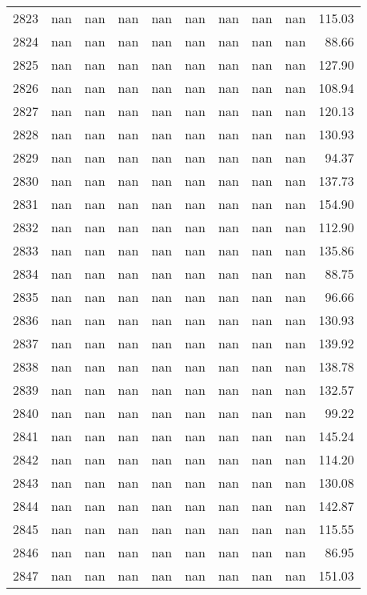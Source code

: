 \begin{tabular}{lrrrrrrrrr}
2823 & nan & nan & nan & nan & nan & nan & nan & nan & 115.03 \\
2824 & nan & nan & nan & nan & nan & nan & nan & nan & 88.66 \\
2825 & nan & nan & nan & nan & nan & nan & nan & nan & 127.90 \\
2826 & nan & nan & nan & nan & nan & nan & nan & nan & 108.94 \\
2827 & nan & nan & nan & nan & nan & nan & nan & nan & 120.13 \\
2828 & nan & nan & nan & nan & nan & nan & nan & nan & 130.93 \\
2829 & nan & nan & nan & nan & nan & nan & nan & nan & 94.37 \\
2830 & nan & nan & nan & nan & nan & nan & nan & nan & 137.73 \\
2831 & nan & nan & nan & nan & nan & nan & nan & nan & 154.90 \\
2832 & nan & nan & nan & nan & nan & nan & nan & nan & 112.90 \\
2833 & nan & nan & nan & nan & nan & nan & nan & nan & 135.86 \\
2834 & nan & nan & nan & nan & nan & nan & nan & nan & 88.75 \\
2835 & nan & nan & nan & nan & nan & nan & nan & nan & 96.66 \\
2836 & nan & nan & nan & nan & nan & nan & nan & nan & 130.93 \\
2837 & nan & nan & nan & nan & nan & nan & nan & nan & 139.92 \\
2838 & nan & nan & nan & nan & nan & nan & nan & nan & 138.78 \\
2839 & nan & nan & nan & nan & nan & nan & nan & nan & 132.57 \\
2840 & nan & nan & nan & nan & nan & nan & nan & nan & 99.22 \\
2841 & nan & nan & nan & nan & nan & nan & nan & nan & 145.24 \\
2842 & nan & nan & nan & nan & nan & nan & nan & nan & 114.20 \\
2843 & nan & nan & nan & nan & nan & nan & nan & nan & 130.08 \\
2844 & nan & nan & nan & nan & nan & nan & nan & nan & 142.87 \\
2845 & nan & nan & nan & nan & nan & nan & nan & nan & 115.55 \\
2846 & nan & nan & nan & nan & nan & nan & nan & nan & 86.95 \\
2847 & nan & nan & nan & nan & nan & nan & nan & nan & 151.03 \\

\end{tabular}

